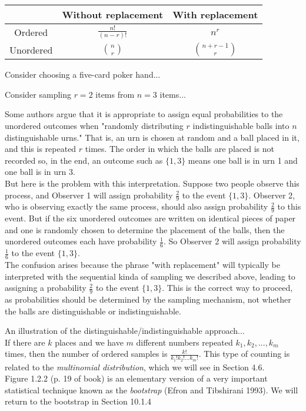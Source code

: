 \begin{center}
\begin{tabular}{c|c|c|}
     &  Without replacement & With replacement \\ \hline
     Ordered & $\frac{n!}{(n - r)!}$ & $n^r$ \\ 
     Unordered & $\binom{n}{r}$ & $\binom{n + r - 1}{r}$
\end{tabular}
\end{center}
\begin{exmp}[Poker]
    Consider choosing a five-card poker hand...
\end{exmp}
\begin{exmp}
    Consider sampling $r = 2$ items from $n = 3$ items...
\end{exmp}
 Some authors argue that it is appropriate to assign equal probabilities to the unordered outcomes when "randomly distributing $r$ indistinguishable balls into $n$ distinguishable urns." That is, an urn is chosen at random and a ball placed in it, and this is repeated $r$ times. The order in which the balls are placed is not recorded so, in the end, an outcome such as $\{1,3\}$ means one ball is in urn 1 and one ball is in urn 3. \\
 But here is the problem with this interpretation. Suppose two people observe this process, and Observer 1 will assign probability $\frac{2}{9}$ to the event $\{1,3\}$. Observer 2, who is observing exactly the same process, should also assign probability $\frac{2}{9}$ to this event. But if the six unordered outcomes are written on identical pieces of paper and one is randomly chosen to determine the placement of the balls, then the unordered outcomes each have probability $\frac{1}{6}$. So Observer 2 will assign probability $\frac{1}{6}$ to the event $\{1,3\}$. \\
 The confusion arises because the phrase "with replacement" will typically be interpreted with the sequential kinda of sampling we described above, leading to assigning a probability $\frac{2}{9}$ to the event $\{1,3\}$. This is the correct way to proceed, as probabilities should be determined by the sampling mechanism, not whether the balls are distinguishable or indistinguishable.
\begin{exmp}
    An illustration of the distinguishable/indistinguishable approach... \\
    If there are $k$ places and we have $m$ different numbers repeated $k_1, k_2, ..., k_m$ times, then the number of ordered samples is $\frac{k!}{k_1!k_2!...k_m!}$. This type of counting is related to the \textit{multinomial distribution}, which we will see in Section 4.6. \\
    Figure 1.2.2 (p. 19 of book) is an elementary version of a very important statistical technique known as the \textit{bootstrap} (Efron and Tibshirani 1993). We will return to the bootstrap in Section 10.1.4
\end{exmp}
